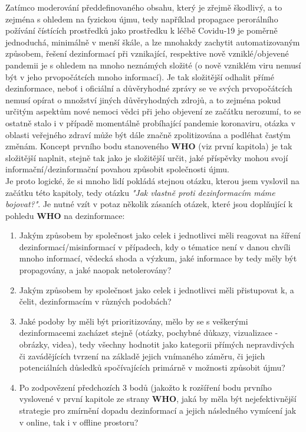 
Zatímco moderování předdefinovaného obsahu, který je zřejmě škodlivý, a to zejména s ohledem na fyzickou újmu, tedy například propagace perorálního požívání čístících prostředků jako prostředku k léčbě Covidu-19 je poměrně jednoduchá, minimálně v menší škále, a lze mnohakdy zachytit automatizovaným způsobem, řešení dezinformací při vznikající, respektive nově vzniklé/objevené pandemii je s ohledem na mnoho neznámých složité (o nově vzniklém viru nemusí být v jeho prvopočátcích mnoho informací). Je tak složitější odhalit přímé dezinformace, neboť i oficiální a důvěryhodné zprávy se ve svých prvopočátcích nemusí opírat o množství jiných důvěryhodných zdrojů, a to zejména pokud určitým aspektům nové nemoci vědci při jeho objevení ze začátku nerozumí, to se ostatně stalo i v případě momentálně probíhající pandemie koronaviru, otázka v oblasti veřejného zdraví může být dále značně zpolitizována a podléhat častým změnám. Koncept prvního bodu stanoveného \textbf{WHO} (viz první kapitola) je tak složitější naplnit, stejně tak jako je složitější určit, jaké příspěvky mohou svojí informační/dezinformační povahou způsobit společnosti újmu.\\

Je proto logické, že si mnoho lidí pokládá stejnou otázku, kterou jsem vyslovil na začátku této kapitoly, tedy otázku \textit{"Jak vlastně proti dezinformacím máme bojovat?"}. Je nutné vzít v potaz několik zásaních otázek, které jsou doplňující k pohledu \textbf{WHO} na dezinformace:\\

\begin{enumerate}
\item Jakým způsobem by společnost jako celek i jednotlivci měli reagovat na šíření dezinformací/misinformací v případech, kdy o tématice není v danou chvíli mnoho informací, vědecká shoda a výzkum, jaké informace by tedy měly být propagovány, a jaké naopak netolerovány?
\item Jakým způsobem by společnost jako celek i jednotlivci měli přistupovat k, a čelit, dezinformacím v různých podobách?
\item Jaké podoby by měli být prioritizovány, mělo by se s veškerými dezinformacemi zacházet stejně (otázky, pochybné důkazy, vizualizace - obrázky, videa), tedy všechny hodnotit jako kategorii přímých nepravdivých či zavádějících tvrzení na základě jejich vnímaného záměru, či jejich potenciálních důsledků spočívajících primárně v možnosti způsobit újmu?
\item Po zodpovězení předchozích 3 bodů (jakožto k rozšíření bodu prvního vyslovené v první kapitole ze strany \textbf{WHO}, jaká by měla být nejefektivnější strategie pro zmírnění dopadu dezinformací a jejich následného vymícení jak v online, tak i v offline prostoru? 
\end{enumerate}
\vspace*{5mm}

